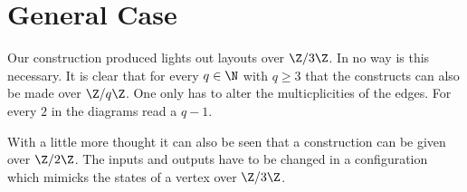 \section{General Case}\label{section:general}

Our construction produced lights out layouts over $\Z/3\Z$. In no way
is this necessary. It is clear that for every $q\in\N$ with $q\ge 3$
that the constructs can also be made over $\Z/q\Z$. One only has to
alter the multicplicities of the edges. For every $2$ in the diagrams
read a $q-1$.

With a little more thought it can also be seen that a construction can be
given over $\Z/2\Z$. The inputs and outputs have to be changed in a
configuration which mimicks the states of a vertex over $\Z/3\Z$. 

